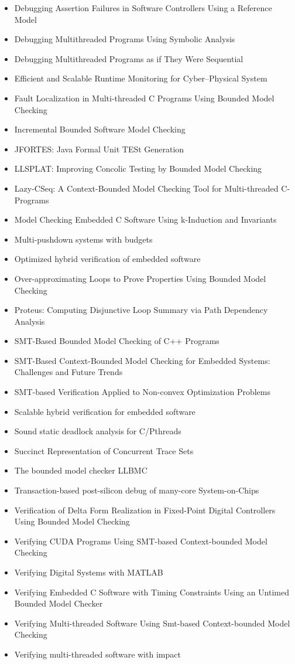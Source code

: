 \begin{itemize}
\item Debugging Assertion Failures in Software Controllers Using a Reference Model
\item Debugging Multithreaded Programs Using Symbolic Analysis
\item Debugging Multithreaded Programs as if They Were Sequential
\item Efficient and Scalable Runtime Monitoring for Cyber--Physical System
\item Fault Localization in Multi-threaded C Programs Using Bounded Model Checking
\item Incremental Bounded Software Model Checking
\item JFORTES: Java Formal Unit TESt Generation
\item LLSPLAT: Improving Concolic Testing by Bounded Model Checking
\item Lazy-CSeq: A Context-Bounded Model Checking Tool for Multi-threaded C-Programs
\item Model Checking Embedded C Software Using k-Induction and Invariants
\item Multi-pushdown systems with budgets
\item Optimized hybrid verification of embedded software
\item Over-approximating Loops to Prove Properties Using Bounded Model Checking
\item Proteus: Computing Disjunctive Loop Summary via Path Dependency Analysis
\item SMT-Based Bounded Model Checking of C++ Programs
\item SMT-Based Context-Bounded Model Checking for Embedded Systems: Challenges and Future Trends
\item SMT-based Verification Applied to Non-convex Optimization Problems
\item Scalable hybrid verification for embedded software
\item Sound static deadlock analysis for C/Pthreads
\item Succinct Representation of Concurrent Trace Sets
\item The bounded model checker LLBMC
\item Transaction-based post-silicon debug of many-core System-on-Chips
\item Verification of Delta Form Realization in Fixed-Point Digital Controllers Using Bounded Model Checking
\item Verifying CUDA Programs Using SMT-based Context-bounded Model Checking
\item Verifying Digital Systems with MATLAB
\item Verifying Embedded C Software with Timing Constraints Using an Untimed Bounded Model Checker
\item Verifying Multi-threaded Software Using Smt-based Context-bounded Model Checking
\item Verifying multi-threaded software with impact
\end{itemize}


